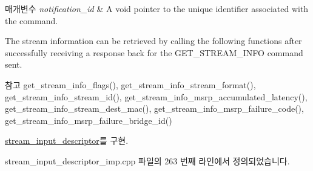 \begin{DoxyParams}{매개변수}
{\em notification\+\_\+id} & A void pointer to the unique identifier associated with the command.\\
\hline
\end{DoxyParams}
The stream information can be retrieved by calling the following functions after successfully receiving a response back for the G\+E\+T\+\_\+\+S\+T\+R\+E\+A\+M\+\_\+\+I\+N\+FO command sent.

\begin{DoxySeeAlso}{참고}
get\+\_\+stream\+\_\+info\+\_\+flags(), get\+\_\+stream\+\_\+info\+\_\+stream\+\_\+format(), get\+\_\+stream\+\_\+info\+\_\+stream\+\_\+id(), get\+\_\+stream\+\_\+info\+\_\+msrp\+\_\+accumulated\+\_\+latency(), get\+\_\+stream\+\_\+info\+\_\+stream\+\_\+dest\+\_\+mac(), get\+\_\+stream\+\_\+info\+\_\+msrp\+\_\+failure\+\_\+code(), get\+\_\+stream\+\_\+info\+\_\+msrp\+\_\+failure\+\_\+bridge\+\_\+id() 
\end{DoxySeeAlso}


\hyperlink{classavdecc__lib_1_1stream__input__descriptor_af1004affeb5ff3cf8bb9356ebcaa3aae}{stream\+\_\+input\+\_\+descriptor}를 구현.



stream\+\_\+input\+\_\+descriptor\+\_\+imp.\+cpp 파일의 263 번째 라인에서 정의되었습니다.


